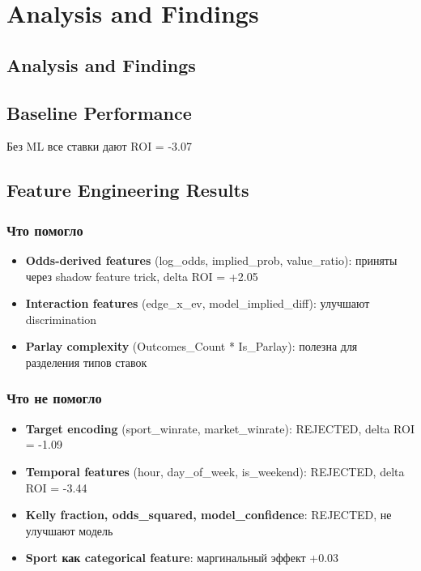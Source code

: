 \documentclass[12pt,a4paper]{article}
\begin{document}
\section{Analysis and Findings}

\subsection{Analysis and Findings}

\subsection{Baseline Performance}
Без ML все ставки дают ROI = -3.07%

\subsection{Feature Engineering Results}

\subsubsection{Что помогло}
\begin{itemize}
  \item \textbf{Odds-derived features} (log_odds, implied_prob, value_ratio): приняты через shadow feature trick, delta ROI = +2.05%
  \item \textbf{Interaction features} (edge_x_ev, model_implied_diff): улучшают discrimination
  \item \textbf{Parlay complexity} (Outcomes_Count * Is_Parlay): полезна для разделения типов ставок
\end{itemize}

\subsubsection{Что не помогло}
\begin{itemize}
  \item \textbf{Target encoding} (sport_winrate, market_winrate): REJECTED, delta ROI = -1.09%
  \item \textbf{Temporal features} (hour, day_of_week, is_weekend): REJECTED, delta ROI = -3.44%
  \item \textbf{Kelly fraction, odds_squared, model_confidence}: REJECTED, не улучшают модель
  \item \textbf{Sport как categorical feature}: маргинальный эффект +0.03%
\end{itemize}
\end{document}
